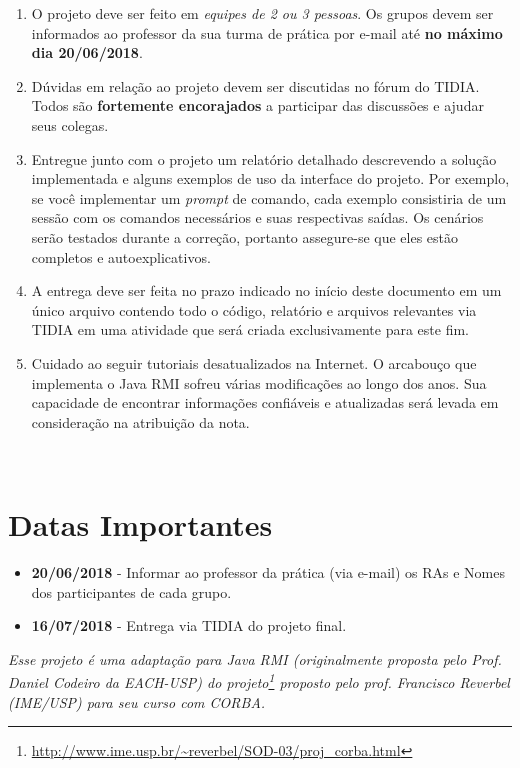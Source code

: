 \documentclass[oneside,12pt,a4paper]{memoir}
\begin{document}
\begin{enumerate}
\item O projeto deve ser feito em \emph{equipes de 2 ou 3 pessoas}. Os
  grupos devem ser informados ao professor da sua turma de prática por
  e-mail até \textbf{no máximo dia 20/06/2018}.

\item Dúvidas em relação ao projeto devem ser discutidas no fórum do
  TIDIA. Todos são \textbf{fortemente encorajados} a participar das
  discussões e ajudar seus colegas.

\item Entregue junto com o projeto um relatório detalhado descrevendo a
  solução implementada e alguns exemplos de uso da interface do
  projeto. Por exemplo, se você implementar um \textit{prompt} de comando,
  cada exemplo consistiria de um sessão com os comandos necessários e
  suas respectivas saídas. Os cenários serão testados durante a correção,
  portanto assegure-se que eles estão completos e autoexplicativos.

\item A entrega deve ser feita no prazo indicado no início deste
  documento em um único arquivo contendo todo o código, relatório e
  arquivos relevantes via TIDIA em uma atividade que será criada
  exclusivamente para este fim.

\item Cuidado ao seguir tutoriais desatualizados na Internet. O
  arcabouço que implementa o Java RMI sofreu várias modificações ao
  longo dos anos. Sua capacidade de encontrar informações confiáveis e
  atualizadas será levada em consideração na atribuição da nota.
\end{enumerate}
\
\section*{Datas Importantes}
\begin{itemize}
\item \textbf{20/06/2018} - Informar ao professor da prática (via e-mail) os
  RAs e Nomes dos participantes de cada grupo.
\item \textbf{16/07/2018} - Entrega via TIDIA do projeto final.
\end{itemize}

\vfill
\emph{Esse projeto é uma adaptação para Java RMI (originalmente proposta
pelo Prof. Daniel Codeiro da EACH-USP) do
projeto\footnote{\url{http://www.ime.usp.br/~reverbel/SOD-03/proj_corba.html}}
proposto pelo prof. Francisco Reverbel (IME/USP) para seu curso com
CORBA.}
\end{document}
